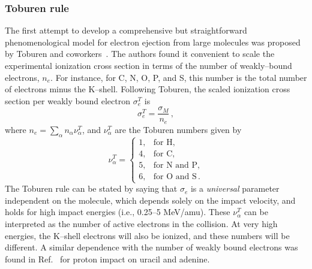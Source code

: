 \documentclass[10pt,showpacs,showkeys,twocolumn]{revtex4}
\begin{document}
\subsubsection{Toburen rule}

The first attempt to develop a comprehensive but straightforward 
phenomenological model for electron ejection from large molecules was 
proposed by Toburen and coworkers~\cite{toburen1975,toburen1976}. 
The authors found it convenient to scale the experimental ionization 
cross section in terms of the number of weakly--bound electrons, $n_e$.
For instance, for C, N, O, P, and S, this number is the total number of 
electrons minus the K--shell. Following Toburen, the scaled ionization 
cross section per weakly bound electron $\sigma_{e}^T$ is
\begin{equation}
\sigma_{e}^T=\frac{\sigma_{M}}{n_e}\,, 
\label{27} 
\end{equation}
where $n_e=\sum_{\alpha}n_{\alpha}\nu_{\alpha}^T$, and $\nu_{\alpha}^T$ 
are the Toburen numbers given by
\begin{equation}
\nu_{\alpha}^T=\left\{ 
\begin{array}{ll}
1, & \text{for H,} \\
4, & \text{for C,} \\ 
5, & \text{for N and P,} \\ 
6, & \text{for O and S}\,.
\end{array}\right.
\label{eq:nelec} 
\end{equation} 
The Toburen rule can be stated by saying that 
$\sigma_{e}$ is a \textit{universal} parameter independent on the 
molecule, which depends solely on the impact velocity, and holds for 
high impact energies (i.e., 0.25--5 MeV/amu).
These $\nu_{\alpha}^T$ can be interpreted as the number of active 
electrons in the collision. At very high energies, the K--shell 
electrons will also be ionized, and these numbers will be different.
A similar dependence with the number of weakly bound electrons was 
found in Ref.~\cite{itoh2013} for proton impact on uracil and adenine.
\end{document}
